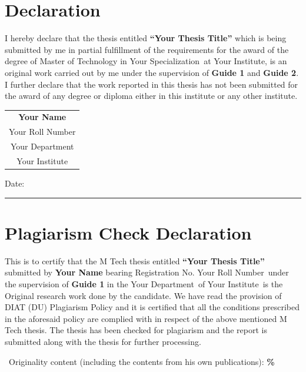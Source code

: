 \documentclass[12pt,a4paper]{report}
\newcommand{\thesistitle}{Your Thesis Title}
\newcommand{\authorname}{Your Name}
\newcommand{\rollnumber}{Your Roll Number}
\newcommand{\guideIname}{Guide 1}
\newcommand{\guideIIname}{Guide 2}
\newcommand{\departmentname}{Your Department}
\newcommand{\institutename}{Your Institute}
\newcommand{\specialization}{Your Specialization}
\begin{document}
\cleardoublepage
\chapter*{Declaration}

I hereby declare that the thesis entitled \textbf{``\thesistitle''} which is being submitted by me in partial fulfillment of the requirements for the award of the degree of Master of Technology in \specialization\ at \institutename, is an original work carried out by me under the supervision of \textbf{\guideIname} and \textbf{\guideIIname}.
I further declare that the work reported in this thesis has not been submitted for the award of any degree or diploma either in this institute or any other institute.
\vspace{2cm}

\begin{flushright}
\begin{tabular}{c}
\textbf{\authorname}\\
\rollnumber\\
\departmentname\\
\institutename
\end{tabular}
\end{flushright}

\vspace{1cm}

\noindent Date: \rule{3cm}{0.4pt}

\cleardoublepage
\chapter*{Plagiarism Check Declaration}

This is to certify that the M Tech thesis entitled \textbf{``\thesistitle''} submitted by \textbf{\authorname} bearing Registration No. \rollnumber\ under the supervision of \textbf{\guideIname} in the \departmentname\ of \institutename\ is the Original research work done by the candidate.
We have read the provision of DIAT (DU) Plagiarism Policy and it is certified that all the conditions prescribed in the aforesaid policy are complied with in respect of the above mentioned M Tech thesis.
The thesis has been checked for plagiarism and the report is submitted along with the thesis for further processing.
\vspace{0.5cm}

\noindent \checkmark\ Originality content (including the contents from his own publications): \textbf{\%}
\end{document}
